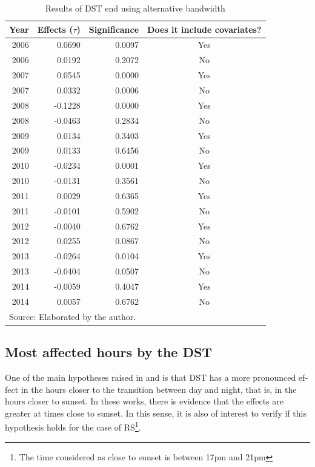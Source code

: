\documentclass[12pt,openright,oneside,a4paper,english,french,spanish]{abntex2}
\numberwithin{table}{section} %
\numberwithin{figure}{section} %
\newcommand{\co}{\citeonline}
\begin{document}
\begin{otherlanguage}{english}
\begin{table}[H]
\caption{Results of DST end using alternative bandwidth}
\begin{center}
\begin{small}
\begin{tabular}{rrrc}
  \hline
Year & Effects ($\tau$) & Significance & Does it include covariates? \\ 
  \hline
  2006 & 0.0690 & 0.0097 & Yes \\ 
  2006 & 0.0192 & 0.2072 & No \\ 
  2007 & 0.0545 & 0.0000 & Yes \\ 
  2007 & 0.0332 & 0.0006 & No \\ 
  2008 & -0.1228 & 0.0000 & Yes \\ 
  2008 & -0.0463 & 0.2834 & No \\ 
  2009 & 0.0134 & 0.3403 & Yes \\ 
  2009 & 0.0133 & 0.6456 & No \\ 
  2010 & -0.0234 & 0.0001 & Yes \\ 
  2010 & -0.0131 & 0.3561 & No \\ 
  2011 & 0.0029 & 0.6365 & Yes \\ 
  2011 & -0.0101 & 0.5902 & No \\ 
  2012 & -0.0040 & 0.6762 & Yes \\ 
  2012 & 0.0255 & 0.0867 & No \\ 
  2013 & -0.0264 & 0.0104 & Yes \\ 
  2013 & -0.0404 & 0.0507 & No \\ 
  2014 & -0.0059 & 0.4047 & Yes \\ 
  2014 & 0.0057 & 0.6762 & No \\
   \hline
\multicolumn{4}{l}{Source: Elaborated by the author.}
\end{tabular}
\end{small}
\end{center}
\label{tab:resultados_saida_bandwidth_alternativa}
\end{table}


\subsection{Most affected hours by the DST\label{robustez_horas_mais_afetadas}}

One of the main hypotheses raised in \co{doleac2015} and \co{toro2016} is that DST has a more pronounced effect in the hours closer to the transition between day and night, that is, in the hours closer to sunset. In these works, there is evidence that the effects are greater at times close to sunset. In this sense, it is also of interest to verify if this hypothesis holds for the case of RS\footnote{The time considered as close to sunset is between 17pm and 21pm}.


\end{otherlanguage}
\end{document}
